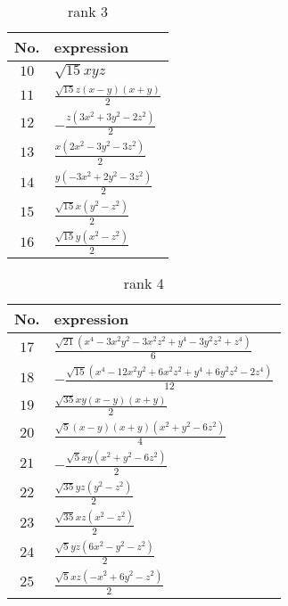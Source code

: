 \documentclass[fleqn,8pt,landscape]{jsarticle}
\begin{document}
\begin{table}[ht!]
\begin{center}
\caption{rank 3}
\renewcommand{\arraystretch}{1.3}
\begin{tabular}{cl} \hline \hline
No. & expression \\ \hline
$ 10 $ & $ \sqrt{15} x y z $ \\
$ 11 $ & $ \frac{\sqrt{15} z \left(x - y\right) \left(x + y\right)}{2} $ \\
$ 12 $ & $ - \frac{z \left(3 x^{2} + 3 y^{2} - 2 z^{2}\right)}{2} $ \\
$ 13 $ & $ \frac{x \left(2 x^{2} - 3 y^{2} - 3 z^{2}\right)}{2} $ \\
$ 14 $ & $ \frac{y \left(- 3 x^{2} + 2 y^{2} - 3 z^{2}\right)}{2} $ \\
$ 15 $ & $ \frac{\sqrt{15} x \left(y^{2} - z^{2}\right)}{2} $ \\
$ 16 $ & $ \frac{\sqrt{15} y \left(x^{2} - z^{2}\right)}{2} $ \\
 \hline \hline
\end{tabular}
\end{center}
\end{table}
\begin{table}[ht!]
\begin{center}
\caption{rank 4}
\renewcommand{\arraystretch}{1.3}
\begin{tabular}{cl} \hline \hline
No. & expression \\ \hline
$ 17 $ & $ \frac{\sqrt{21} \left(x^{4} - 3 x^{2} y^{2} - 3 x^{2} z^{2} + y^{4} - 3 y^{2} z^{2} + z^{4}\right)}{6} $ \\
$ 18 $ & $ - \frac{\sqrt{15} \left(x^{4} - 12 x^{2} y^{2} + 6 x^{2} z^{2} + y^{4} + 6 y^{2} z^{2} - 2 z^{4}\right)}{12} $ \\
$ 19 $ & $ \frac{\sqrt{35} x y \left(x - y\right) \left(x + y\right)}{2} $ \\
$ 20 $ & $ \frac{\sqrt{5} \left(x - y\right) \left(x + y\right) \left(x^{2} + y^{2} - 6 z^{2}\right)}{4} $ \\
$ 21 $ & $ - \frac{\sqrt{5} x y \left(x^{2} + y^{2} - 6 z^{2}\right)}{2} $ \\
$ 22 $ & $ \frac{\sqrt{35} y z \left(y^{2} - z^{2}\right)}{2} $ \\
$ 23 $ & $ \frac{\sqrt{35} x z \left(x^{2} - z^{2}\right)}{2} $ \\
$ 24 $ & $ \frac{\sqrt{5} y z \left(6 x^{2} - y^{2} - z^{2}\right)}{2} $ \\
$ 25 $ & $ \frac{\sqrt{5} x z \left(- x^{2} + 6 y^{2} - z^{2}\right)}{2} $ \\
 \hline \hline
\end{tabular}
\end{center}
\end{table}
\end{document}
